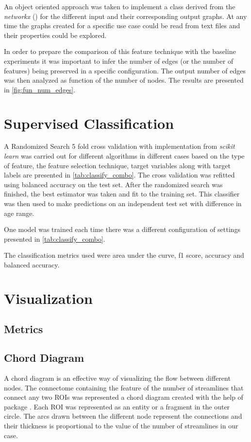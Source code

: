 \documentclass[msthesis.tex]{subfiles}
\begin{document}
An object oriented approach was taken to implement a class derived from the \textit{networkx} (\cite{hagberg2008exploring}) for the different input and their corresponding output graphs. At any time the graphs created for a specific use case could be read from text files and their properties could be explored.

In order to prepare the comparison of this feature technique with the baseline experiments it was important to infer the number of edges (or the number of features) being preserved in a specific configuration. The output number of edges was then analyzed as function of the number of nodes. The results are presented in \autoref{fig:fun_num_edges}.


\section{Supervised Classification}

A Randomized Search 5 fold cross validation with implementation from \textit{scikit learn} was carried out for different algorithms in different cases based on the type of feature, the feature selection technique, target variables along with target labels are presented in \autoref{tab:classify_combo}.  The cross validation was refitted using balanced accuracy on the test set. After the randomized search was finished, the best estimator was taken and fit to the training set. This classifier was then used to make predictions on an independent test set with difference in age range.

One model was trained each time there was a different configuration of settings presented in \autoref{tab:classify_combo}.


The classification metrics used were area under the curve, f1 score, accuracy and balanced accuracy.  


\section{Visualization}
\subsection{Metrics}


\subsection{Chord Diagram}
A chord diagram is an effective way of visualizing the flow between different nodes. The connectome containing the feature of the number of streamlines that connect any two ROIs was represented a chord diagram created with the help of package \cite{stevens2015holoviews}. Each ROI was represented as an entity or a fragment in the outer circle. The arcs drawn between the different node represent the connections and their thickness is proportional to the value of the number of streamlines in our case. 
\end{document}
